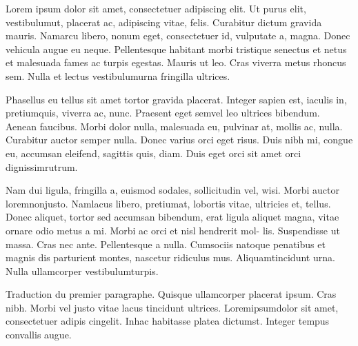 \documentclass{book}
\begin{document}
	



\begin{pages}
	\begin{Leftside}
			\beginnumbering
	\numberpstarttrue
	 \autopar	 
Lorem ipsum dolor sit amet, consectetuer adipiscing elit. Ut purus elit, vestibulumut, placerat ac, adipiscing vitae, felis.
 Curabitur dictum gravida mauris.
 Namarcu libero, nonum eget, consectetuer id, vulputate a, magna.
Donec vehicula augue eu neque. Pellentesque habitant morbi tristique senectus et netus et malesuada fames ac turpis egestas.
 Mauris ut leo. Cras viverra metus rhoncus sem. Nulla et lectus vestibulumurna fringilla ultrices.


Phasellus eu tellus sit amet tortor gravida placerat. Integer sapien est, iaculis in, pretiumquis, viverra ac, nunc. Praesent eget semvel leo ultrices
bibendum. Aenean faucibus. Morbi dolor nulla, malesuada eu, pulvinar at,
mollis ac, nulla. Curabitur auctor semper nulla. Donec varius orci eget risus.
Duis nibh mi, congue eu, accumsan eleifend, sagittis quis, diam. Duis eget
orci sit amet orci dignissimrutrum.

Nam dui ligula, fringilla a, euismod sodales, sollicitudin vel, wisi. Morbi
auctor loremnonjusto. Namlacus libero, pretiumat, lobortis vitae, ultricies
et, tellus. Donec aliquet, tortor sed accumsan bibendum, erat ligula aliquet
magna, vitae ornare odio metus a mi. Morbi ac orci et nisl hendrerit mol-
lis. Suspendisse ut massa. Cras nec ante. Pellentesque a nulla. Cumsociis
natoque penatibus et magnis dis parturient montes, nascetur ridiculus mus.
Aliquamtincidunt urna. Nulla ullamcorper vestibulumturpis. 

\endnumbering

\end{Leftside}



\begin{Rightside}
		\beginnumbering
\numberpstarttrue
\autopar

 Traduction du premier paragraphe. Quisque ullamcorper placerat ipsum. Cras nibh. Morbi vel justo vitae lacus tincidunt ultrices. Loremipsumdolor sit amet, consectetuer adipis cingelit. Inhac habitasse platea dictumst. Integer tempus convallis augue.


\end{Rightside}
\end{pages}
\end{document}
